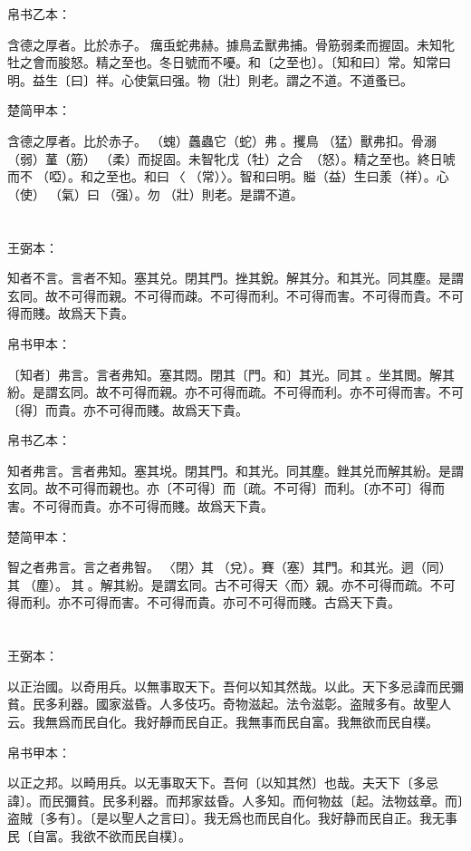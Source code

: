 \documentclass[a5paper]{ctexbook}
\begin{document}
    帛书乙本：

    含德之厚者。比於赤子。𧒒癘䖝蛇弗赫。據鳥孟獸弗捕。骨筋弱柔而握固。未知牝牡之會而朘怒。精之至也。冬日號而不嚘。和〔之至也〕。〔知和曰〕常。知常曰明。益生〔曰〕祥。心使氣曰强。物〔壯〕則老。謂之不道。不道蚤已。

    楚简甲本：

    含德之厚者。比於赤子。󶵎（螝）䘍蟲它（蛇）弗𧍷。攫鳥󶵏（猛）獸弗扣。骨溺（弱）蓳（筋）󶵐（柔）而捉固。未智牝戊（牡）之合󶵑󶵒（怒）。精之至也。終日唬而不𪬐（啞）。和之至也。和曰󶵓〈󼲗（常）〉。智和曰明。賹（益）生曰羕（祥）。心󶴎（使）󶴓（氣）曰󶴔（强）。勿𡒉（壯）則老。是謂不道。

    \chapter{}
    王弼本：

    知者不言。言者不知。塞其兑。閉其門。挫其銳。解其分。和其光。同其塵。是謂玄同。故不可得而親。不可得而疎。不可得而利。不可得而害。不可得而貴。不可得而賤。故爲天下貴。

    
    帛书甲本：

    〔知者〕弗言。言者弗知。塞其悶。閉其〔門。和〕其光。同其𡑁。坐其閲。解其紛。是謂玄同。故不可得而親。亦不可得而疏。不可得而利。亦不可得而害。不可〔得〕而貴。亦不可得而賤。故爲天下貴。

    帛书乙本：

    知者弗言。言者弗知。塞其㙂。閉其門。和其光。同其塵。銼其兑而解其紛。是謂玄同。故不可得而親也。亦〔不可得〕而〔疏。不可得〕而利。〔亦不可〕得而害。不可得而貴。亦不可得而賤。故爲天下貴。

    楚简甲本：

    智之者弗言。言之者弗智。𨳮〈閉〉其𨓚（兌）。賽（塞）其門。和其光。迵（同）其󶴤（塵）。󶴤其󶩴。解其紛。是謂玄同。古不可得天〈而〉親。亦不可得而疏。不可得而利。亦不可得而害。不可得而貴。亦可不可得而賤。古爲天下貴。

    \chapter{}
    王弼本：

    以正治國。以奇用兵。以無事取天下。吾何以知其然哉。以此。天下多忌諱而民彌貧。民多利器。國家滋昏。人多伎巧。奇物滋起。法令滋彰。盗賊多有。故聖人云。我無爲而民自化。我好靜而民自正。我無事而民自富。我無欲而民自樸。

    
    帛书甲本：

    以正之邦。以畸用兵。以无事取天下。吾何〔以知其然〕也哉。夫天下〔多忌諱〕。而民彌貧。民多利器。而邦家兹昏。人多知。而何物兹〔起。法物兹章。而〕盗賊〔多有〕。〔是以聖人之言曰〕。我无爲也而民自化。我好静而民自正。我无事民〔自富。我欲不欲而民自樸〕。
\end{document}
